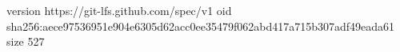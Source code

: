 version https://git-lfs.github.com/spec/v1
oid sha256:aece97536951e904e6305d62acc0ee35479f062abd417a715b307adf49eada61
size 527
